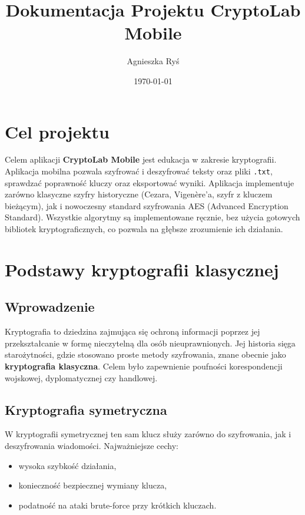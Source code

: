 \documentclass[12pt,a4paper]{article}
\title{Dokumentacja Projektu CryptoLab Mobile}
\author{Agnieszka Ryś}
\date{\today}
\begin{document}
\maketitle
\tableofcontents

\newpage
\section{Cel projektu}
Celem aplikacji \textbf{CryptoLab Mobile} jest edukacja w zakresie kryptografii. 
Aplikacja mobilna pozwala szyfrować i deszyfrować teksty oraz pliki \texttt{.txt}, 
sprawdzać poprawność kluczy oraz eksportować wyniki. 
Aplikacja implementuje zarówno klasyczne szyfry historyczne (Cezara, Vigenère'a, szyfr z kluczem bieżącym), 
jak i nowoczesny standard szyfrowania AES (Advanced Encryption Standard).
Wszystkie algorytmy są implementowane ręcznie, bez użycia gotowych bibliotek kryptograficznych, 
co pozwala na głębsze zrozumienie ich działania.

\section{Podstawy kryptografii klasycznej}

\subsection*{Wprowadzenie}
Kryptografia to dziedzina zajmująca się ochroną informacji poprzez jej przekształcanie w formę nieczytelną dla osób nieuprawnionych. 
Jej historia sięga starożytności, gdzie stosowano proste metody szyfrowania, znane obecnie jako \textbf{kryptografia klasyczna}. 
Celem było zapewnienie poufności korespondencji wojskowej, dyplomatycznej czy handlowej. 

\subsection{Kryptografia symetryczna}
W kryptografii symetrycznej ten sam klucz służy zarówno do szyfrowania, jak i deszyfrowania wiadomości. 
Najważniejsze cechy:
\begin{itemize}
    \item wysoka szybkość działania,
    \item konieczność bezpiecznej wymiany klucza,
    \item podatność na ataki brute-force przy krótkich kluczach.
\end{itemize}
\end{document}
